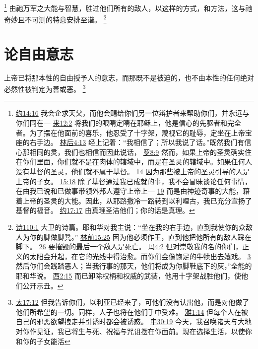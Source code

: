 \documentclass[12pt, a4paper, oneside]{ctexart}
\newcounter{parnum}[section]
\newcommand{\N}{%
   \noindent\refstepcounter{parnum}%
    \makebox[\parindent][l]{\textbf{\arabic{parnum}.}}}
\begin{document}
	\footnote {
		\href{https://biblehub.com/john/14-16.htm}{约14:16} 我会企求天父，而他会赐给你们另一位辩护者来帮助你们，并永远与你们同在---
		\href{https://biblehub.com/hebrews/12-2.htm}{来12:2} 将我们的眼睛定睛在耶稣上，他是信心的先驱者和完全者。为了摆在他面前的喜乐，他忍受了十字架，蔑视它的耻辱，定坐在上帝宝座的右手边。
		\href{https://biblehub.com/2_corinthians/4-13.htm}{林后4:13} 经上记着：“我相信了；所以我说了话。”既然我们有信心那相同的灵，我们也相信而因此说话，
		\href{https://biblehub.com/romans/8-9.htm}{罗8:9} 然而，如果上帝的圣灵确实住在你们里面，你们就不是在肉体的辖域中，而是在圣灵的辖域中。如果任何人没有基督的圣灵，他们就不属于基督。
		\href{https://biblehub.com/romans/8-14.htm}{14} 因为那些被上帝的圣灵引导的人是上帝的子女。
		\href{https://biblehub.com/romans/15-18.htm}{15:18} 除了基督通过我已成就的事，我不会冒昧谈论任何事情，在由我已说和已做事带领外邦人遵守上帝上---
		\href{https://biblehub.com/romans/15-19.htm}{19} 而是由神迹奇事的大能，藉着上帝的圣灵的大能。因此，从耶路撒冷一路转到以利哩古，我已充分宣扬了基督的福音。
		\href{https://biblehub.com/john/17-17.htm}{约17:17} 由真理圣洁他们；你的话是真理。
	}
	由祂万军之大能与智慧，胜过他们所有的敌人，以这样的方式，和方法，这与祂奇妙且不可测的特意安排至谐。
	\footnote {
		\href{https://biblehub.com/psalms/110-1.htm}{诗110:1} 大卫的诗篇。耶和华对我主说：“坐在我的右手边，直到我使你的众敌人为你的脚做脚凳。”
		\href{https://biblehub.com/1_corinthians/15-25.htm}{林前15:25} 因为他必须作王，直到他把他所有的敌人踩在脚下。
		\href{https://biblehub.com/1_corinthians/15-26.htm}{26} 要摧毁的最后一个敌人是死亡。
		\href{https://biblehub.com/malachi/4-2.htm}{玛4:2} 但对崇敬我的名的你们，正义的太阳会升起，在它的光线中得治愈。而你们会像饱足的牛犊出去嬉戏。
		\href{https://biblehub.com/malachi/4-3.htm}{3} 然后你们会践踏恶人；当我行事的那天，他们将成为你脚鞋底下的灰，”全能的耶和华说。
		\href{https://biblehub.com/colossians/2-15.htm}{西2:15} 而已卸除权柄和权威的武装，他用十字架战胜他们，使他们公开示丑。
	}

\section{论自由意志}

\N 上帝已将那本性的自由授予人的意志，而那既不是被迫的，也不由本性的任何绝对必然性被判定为善或恶。
	\footnote {
		\href{https://biblehub.com/matthew/17-12.htm}{太17:12} 但我告诉你们，以利亚已经来了，可他们没有认出他，而是对他做了他们所希望的一切。同样，人子也将在他们手中受难。
		\href{https://biblehub.com/james/1-14.htm}{雅1:14} 但每个人在被自己的邪恶欲望拽走并引诱时都会被诱惑。
		\href{https://biblehub.com/deuteronomy/30-19.htm}{申30:19} 今天，我召唤诸天与大地对你作见证，我已将生与死、祝福与咒诅摆在你面前。现在选择生活，以使你和你的子女能活
	}
\end{document}
